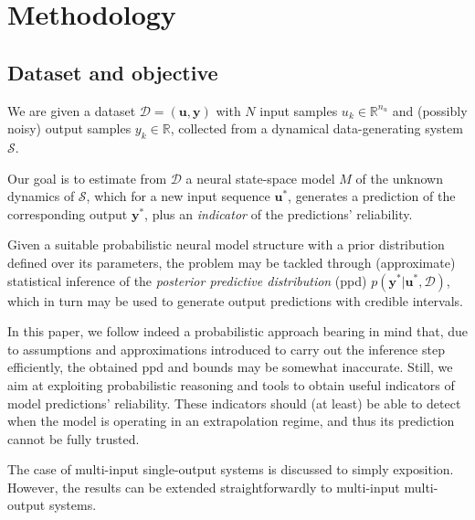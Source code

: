 \documentclass{article}
\newcommand{\nin}{{n_u}}
\newcommand{\nsamp}{N}
\newcommand{\tvec}[1]{{\mathbf{#1}}}
\newcommand{\D}{\mathcal{D}} %
\begin{document}
\section{Methodology}
\subsection{Dataset and objective}
We are given a dataset $\D=(\tvec{u}, \tvec{y})$ with $\nsamp$ input samples $u_k \in \mathbb{R}^{\nin}$ and (possibly noisy) output samples $y_k \in \mathbb{R}$, collected from a dynamical data-generating system $\mathcal{S}$. 

Our goal is to estimate from $\D$ a neural state-space model $M$ of the unknown dynamics of $\mathcal{S}$, which for a new input sequence $\tvec{u}^*$, generates a prediction of the corresponding output ${\tvec{y}}^*$, plus an \emph{indicator} of the predictions' reliability. 

Given a suitable probabilistic neural model structure with a prior distribution defined over its parameters, the problem may be tackled through (approximate) statistical inference of the \emph{posterior predictive distribution}  (ppd) $p(\tvec{y}^* | \tvec{u}^*, \D)$, which in turn may be used to generate output predictions with credible intervals. 

In this paper, we follow indeed a probabilistic approach bearing in mind that, due to assumptions and approximations introduced to carry out the inference step efficiently, the obtained ppd and bounds may be somewhat inaccurate. Still, we aim at exploiting probabilistic reasoning and tools to obtain  useful
indicators of model predictions' reliability. These indicators should (at least) be able to detect when the model is operating in an extrapolation
regime, and thus its prediction cannot be fully trusted.

The case of multi-input single-output systems is discussed to simply exposition. However, the results can be extended straightforwardly to multi-input multi-output systems. 
\end{document}
